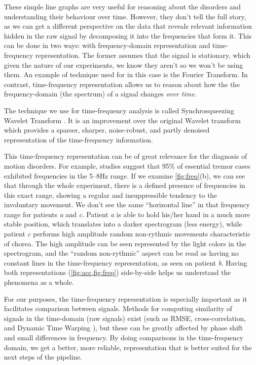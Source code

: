 These simple line graphs are very useful for reasoning about the disorders and understanding their behaviour over time. However, they don't tell the full story, as we can get a different perspective on the data that reveals relevant information hidden in the raw signal by decomposing it into the frequencies that form it. This can be done in two ways: with frequency-domain representation and time-frequency representation. The former assumes that the signal is stationary, which given the nature of our experiments, we know they aren't so we won't be using them. An example of technique used for in this case is the Fourier Transform. In contrast, time-frequency representation allows us to reason about how the the frequency-domain (the spectrum) of a signal changes \textit{over time}.

The technique we use for time-frequency analysis is called Synchrosqueezing Wavelet Transform . It is an improvement over the original Wavelet transform  which provides a sparser, sharper, noise-robust, and partly denoised representation of the time-frequency information. 

This time-frequency representation can be of great relevance for the diagnosis of motion disorders. For example, studies suggest that 95\% of essential tremor cases exhibited frequencies in the 5--8Hz range. If we examine \cref{fig:freq}(b), we can see that through the whole experiment, there is a defined presence of frequencies in this exact range, showing a regular and insuppressible tendency to the involuntary movement. We don't see the same ``horizontal line'' in that frequency range for patients \textit{a} and \textit{c}. Patient \textit{a} is able to hold his/her hand in a much more stable position, which translates into a darker spectrogram (less energy), while patient \textit{c} performs high amplitude random non-rythmic movements characteristic of chorea. The high amplitude can be seen represented by the light colors in the spectrogram, and the ``random non-rythmic'' aspect can be read as having no constant lines in the time-frequency representation, as seen on patient \textit{b}. Having both representations (\cref{fig:acc,fig:freq}) side-by-side helps us understand the phenomena as a whole. 

For our purposes, the time-frequency representation is especially important as it facilitates comparison between signals. Methods for computing similarity of signals in the time-domain (raw signals) exist (such as RMSE, cross-correlation, and Dynamic Time Warping ), but these can be greatly affected by phase shift and small differences in frequency. By doing comparisons in the time-frequency domain, we get a better, more reliable, representation that is better suited for the next steps of the pipeline.

